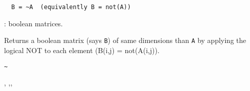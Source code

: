 \begin{mandesc}
\end{mandesc}

\begin{calling_sequence}
\begin{verbatim}
  B = ~A  (equivalently B = not(A))
\end{verbatim}
\end{calling_sequence}
\begin{parameters}
  \begin{varlist}
    : boolean matrices. 
  \end{varlist}
\end{parameters}

\begin{mandescription}
  Returns a boolean matrix (says \verb+B+) of same dimensions than \verb+A+ by applying
  the logical NOT to each element (B(i,j) = not(A(i,j)).
\end{mandescription}

\begin{examples}
  \begin{program}\verb+~+
  \end{program}

\end{examples}

\begin{manseealso}
  , ,,   
\end{manseealso}

